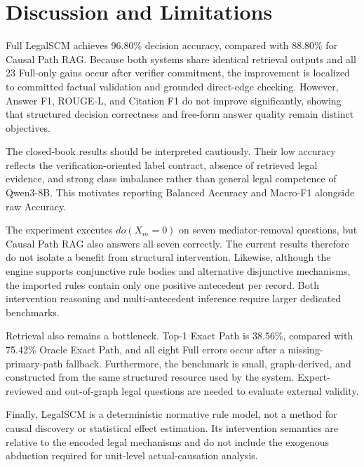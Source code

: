 \section{Discussion and Limitations}
\label{sec:discussion_limitations}

Full LegalSCM achieves 96.80\% decision accuracy, compared with 88.80\% for
Causal Path RAG. Because both systems share identical retrieval outputs and all
23 Full-only gains occur after verifier commitment, the improvement is
localized to committed factual validation and grounded direct-edge checking.
However, Answer F1, ROUGE-L, and Citation F1 do not improve significantly,
showing that structured decision correctness and free-form answer quality
remain distinct objectives.

The closed-book results should be interpreted cautiously. Their low accuracy
reflects the verification-oriented label contract, absence of retrieved legal
evidence, and strong class imbalance rather than general legal competence of
Qwen3-8B. This motivates reporting Balanced Accuracy and Macro-F1 alongside raw
Accuracy.

The experiment executes $do(X_m=0)$ on seven mediator-removal questions, but
Causal Path RAG also answers all seven correctly. The current results therefore
do not isolate a benefit from structural intervention. Likewise, although the
engine supports conjunctive rule bodies and alternative disjunctive mechanisms,
the imported rules contain only one positive antecedent per record. Both
intervention reasoning and multi-antecedent inference require larger dedicated
benchmarks.

Retrieval also remains a bottleneck. Top-1 Exact Path is 38.56\%, compared with
75.42\% Oracle Exact Path, and all eight Full errors occur after a
missing-primary-path fallback. Furthermore, the benchmark is small,
graph-derived, and constructed from the same structured resource used by the
system. Expert-reviewed and out-of-graph legal questions are needed to evaluate
external validity.

Finally, LegalSCM is a deterministic normative rule model, not a method for
causal discovery or statistical effect estimation. Its intervention semantics
are relative to the encoded legal mechanisms and do not include the exogenous
abduction required for unit-level actual-causation analysis.

